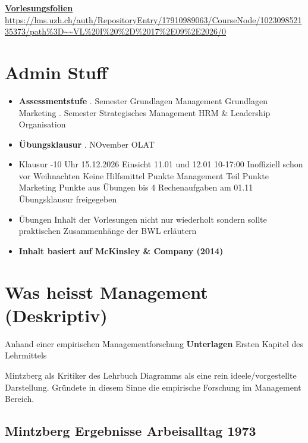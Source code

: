 
\href{https://lms.uzh.ch/auth/RepositoryEntry/17910989063/CourseNode/102309852135373/path%3D~~VL%20I%20%2D%2017%2E09%2E2026/0}{\textbf{Vorlesungsfolien}}
\url{https://lms.uzh.ch/auth/RepositoryEntry/17910989063/CourseNode/102309852135373/path%3D~~VL%20I%20%2D%2017%2E09%2E2026/0}
\section{Admin Stuff}
\begin{itemize}
    \item \textbf{Assessmentstufe}
    . Semester
        \subsubitem Grundlagen Management
        \subsubitem Grundlagen Marketing
    . Semester
        \subsubitem Strategisches Management
        \subsubitem HRM \& Leadership
        \subsubitem Organisation
    \item \textbf{Übungsklausur}
        . NOvember OLAT
    \item Klausur
        -10 Uhr 15.12.2026
        \subitem Einsicht 11.01 und 12.01 10-17:00
        \subitem Inoffiziell schon vor Weihnachten
        \subitem Keine Hilfsmittel
         Punkte Management Teil
         Punkte Marketing
         Punkte aus Übungen
         bis 4 Rechenaufgaben  
        \subitem am 01.11 Übungsklausur freigegeben
    \item Übungen
     \subitem Inhalt der Vorlesungen nicht nur wiederholt sondern sollte praktischen Zusammenhänge der BWL erläutern
    \item \textbf{Inhalt basiert auf McKinsley \& Company (2014)}
\end{itemize}



\section{Was heisst Management (Deskriptiv)}
Anhand einer empirischen Managementforschung
\textbf{Unterlagen} Ersten Kapitel des Lehrmittels

Mintzberg als Kritiker des Lehrbuch Diagramms als eine rein ideele/vorgestellte Darstellung.
Gründete in diesem Sinne die empirische Forschung im Management Bereich.

\subsection{Mintzberg Ergebnisse Arbeisalltag 1973}

